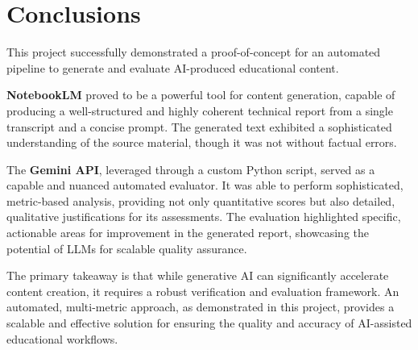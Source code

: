 \section{Conclusions}

This project successfully demonstrated a proof-of-concept for an automated pipeline to generate and evaluate AI-produced educational content.

\textbf{NotebookLM} proved to be a powerful tool for content generation, capable of producing a well-structured and highly coherent technical report from a single transcript and a concise prompt. The generated text exhibited a sophisticated understanding of the source material, though it was not without factual errors.

The \textbf{Gemini API}, leveraged through a custom Python script, served as a capable and nuanced automated evaluator. It was able to perform sophisticated, metric-based analysis, providing not only quantitative scores but also detailed, qualitative justifications for its assessments. The evaluation highlighted specific, actionable areas for improvement in the generated report, showcasing the potential of LLMs for scalable quality assurance.

The primary takeaway is that while generative AI can significantly accelerate content creation, it requires a robust verification and evaluation framework. An automated, multi-metric approach, as demonstrated in this project, provides a scalable and effective solution for ensuring the quality and accuracy of AI-assisted educational workflows.

